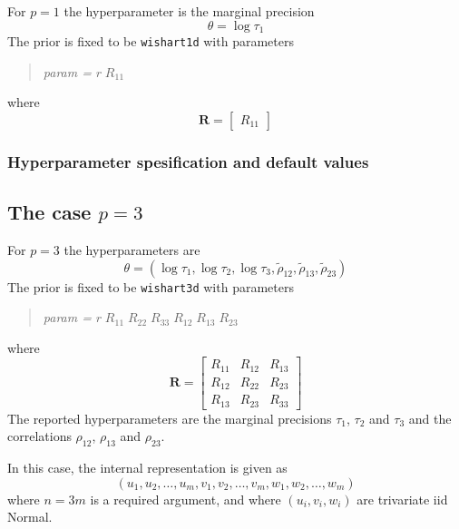 \documentclass[a4paper,11pt]{article}
\begin{document}
For $p=1$ the
hyperparameter is the marginal precision
\begin{displaymath}
    \theta = \log \tau_{1}
\end{displaymath}
The prior is fixed to be \texttt{wishart1d} with parameters
\begin{quote}
    \emph{param = } $r\;R_{11}$
\end{quote}
where
\begin{displaymath}
    \mathbf{R} =
    \left[\begin{array}{c}
        R_{11}
    \end{array}\right]
\end{displaymath}

\subsubsection*{Hyperparameter spesification and default values}



\subsection*{The case $p=3$}

For $p=3$ the
hyperparameters are
\begin{displaymath}
    \theta = (\log \tau_{1}, \log \tau_{2}, \log \tau_{3},
    \tilde\rho_{12},
    \tilde\rho_{13},
    \tilde\rho_{23})
\end{displaymath}
The prior is fixed to be \texttt{wishart3d} with parameters
\begin{quote}
    \emph{param = } $r\;R_{11}\;R_{22}\;R_{33}\; R_{12}\;
    R_{13}\; R_{23}$
\end{quote}
where
\begin{displaymath}
    \mathbf{R} =
    \left[\begin{array}{ccc}
        R_{11} &R_{12} & R_{13}\\
        R_{12} & R_{22} & R_{23}\\
        R_{13} & R_{23} & R_{33}
    \end{array}\right]
\end{displaymath}
The reported hyperparameters are the marginal precisions $\tau_{1}$,
$\tau_{2}$ and $\tau_{3}$ and the correlations $\rho_{12}$,
$\rho_{13}$ and $\rho_{23}$.

In this case, the internal representation is given as
\begin{displaymath}
    (u_{1}, u_{2}, \ldots, u_{m}, v_{1}, v_{2}, \ldots, v_{m},
    w_{1}, w_{2}, \ldots, w_{m})
\end{displaymath}
where $n=3m$ is a required argument, and where $(u_{i}, v_{i}, w_{i})$
are trivariate iid Normal.
\end{document}
